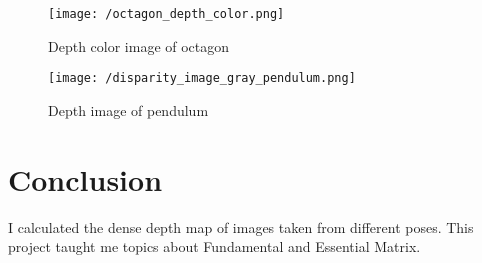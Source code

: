 \documentclass[a4paper, 10pt]{article}
\begin{document}
\begin{multicols}{2}
		\begin{figure}[H]
		\centering
		\texttt{[image: /octagon\_depth\_color.png]}
		\caption{Depth color image of octagon}
		\label{fig:octa_depth_color}
		\end{figure}
	
	
		\begin{figure}[H]
			\centering
			\texttt{[image: /disparity\_image\_gray\_pendulum.png]}
			\caption{Depth image of pendulum}
			\label{fig:pendulum}
		\end{figure}
	
		\section{Conclusion}
		I calculated the dense depth map of images taken from different poses. This project taught me topics about Fundamental and Essential Matrix.
		
		
	\end{multicols}
	
	
	
\end{document}
